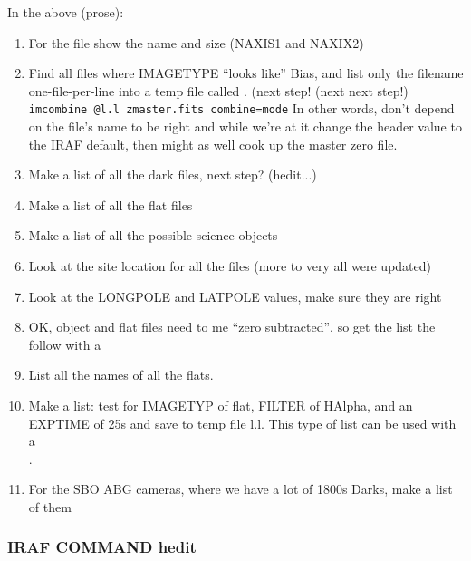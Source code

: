 \documentclass[letter,11pt,oneside]{article}
\begin{document}
In the above (prose):

\vspace{-.15cm}
\begin{enumerate}[resume]\addtolength{\itemsep}{-0.5\baselineskip}
   \item   For the file {\color{verbcolor}{\verb#c_Flat_0011.fits#}} show the name
and size (NAXIS1 and NAXIX2)
   \item   Find all files where IMAGETYPE ``looks like'' Bias, and list only the
filename {\color{verbcolor}{\verb#($I)#}} one-file-per-line into a
temp file called {\color{verbcolor}{\verb#l.l#}}.
(next step! {\color{verbcolor}{\verb#hedit @l.l IMAGETYP zero add+ ver- show- update+#}}
(next next step!) {\color{verbcolor}\\
{\verb#imcombine @l.l zmaster.fits combine=mode#}}
In other words, don't depend on the file's name to be right and while we're at it
change the header value to the IRAF default, then might as well cook up the
master zero file.
   \item   Make a list of all the dark files, next step? (hedit...)
   \item   Make a list of all the flat files
   \item   Make a list of  all the possible science objects
   \item   Look at the site location for all the files (more to very all were updated)
   \item   Look at the LONGPOLE and LATPOLE values, make sure they are right
   \item   OK, object and flat files need to me ``zero subtracted'', so get the list
the follow with a \\
{\color{verbcolor}{\verb#imarith @l.l - zmaster.fits z_//@l.l#}}
   \item   List all the names of all the flats.
   \item   Make a list: test for IMAGETYP of flat, FILTER of HAlpha, and an EXPTIME of 25s
and save to temp file l.l. This type of list can be used with a \\
{\color{verbcolor}{\verb#imcombine @l.l flatmaster.fits ...#}} .
   \item   For the SBO ABG cameras, where we have a lot of 1800s Darks, make a list of them
\end{enumerate}
\clearpage
\subsubsection{IRAF COMMAND hedit}
\begin{quote}
{\color{verbcolor}{\verb#hedit listoffiles keyword newvalue switches#}}
\end{quote}
\end{document}
